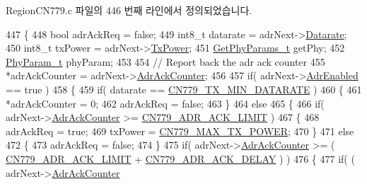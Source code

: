 Region\+C\+N779.\+c 파일의 446 번째 라인에서 정의되었습니다.


\begin{DoxyCode}
447 \{
448     \textcolor{keywordtype}{bool} adrAckReq = \textcolor{keyword}{false};
449     int8\_t datarate = adrNext->\mbox{\hyperlink{structs_adr_next_params_ae2f6080f3aa0e9485c55513ca56bb24d}{Datarate}};
450     int8\_t txPower = adrNext->\mbox{\hyperlink{structs_adr_next_params_a037b4f849fa8ed4aa1d3c58aef2b28ec}{TxPower}};
451     \mbox{\hyperlink{structs_get_phy_params}{GetPhyParams\_t}} getPhy;
452     \mbox{\hyperlink{unionu_phy_param}{PhyParam\_t}} phyParam;
453 
454     \textcolor{comment}{// Report back the adr ack counter}
455     *adrAckCounter = adrNext->\mbox{\hyperlink{structs_adr_next_params_a24f0356a3491bf07be9ac99ffa33896a}{AdrAckCounter}};
456 
457     \textcolor{keywordflow}{if}( adrNext->\mbox{\hyperlink{structs_adr_next_params_ab3e2fb44577c95786e11aacd56769703}{AdrEnabled}} == \textcolor{keyword}{true} )
458     \{
459         \textcolor{keywordflow}{if}( datarate == \mbox{\hyperlink{group___r_e_g_i_o_n_c_n779_ga78e9e4ce4dd6df844573865d9de7e268}{CN779\_TX\_MIN\_DATARATE}} )
460         \{
461             *adrAckCounter = 0;
462             adrAckReq = \textcolor{keyword}{false};
463         \}
464         \textcolor{keywordflow}{else}
465         \{
466             \textcolor{keywordflow}{if}( adrNext->\mbox{\hyperlink{structs_adr_next_params_a24f0356a3491bf07be9ac99ffa33896a}{AdrAckCounter}} >= \mbox{\hyperlink{group___r_e_g_i_o_n_c_n779_ga8c19c4c4ef1a00d6865607b7d61f0325}{CN779\_ADR\_ACK\_LIMIT}} )
467             \{
468                 adrAckReq = \textcolor{keyword}{true};
469                 txPower = \mbox{\hyperlink{group___r_e_g_i_o_n_c_n779_ga8a70356561f3416db21a1e93b4ee4ae9}{CN779\_MAX\_TX\_POWER}};
470             \}
471             \textcolor{keywordflow}{else}
472             \{
473                 adrAckReq = \textcolor{keyword}{false};
474             \}
475             \textcolor{keywordflow}{if}( adrNext->\mbox{\hyperlink{structs_adr_next_params_a24f0356a3491bf07be9ac99ffa33896a}{AdrAckCounter}} >= ( \mbox{\hyperlink{group___r_e_g_i_o_n_c_n779_ga8c19c4c4ef1a00d6865607b7d61f0325}{CN779\_ADR\_ACK\_LIMIT}} + 
      \mbox{\hyperlink{group___r_e_g_i_o_n_c_n779_ga56814f06a0fa6b826baad368920004a4}{CN779\_ADR\_ACK\_DELAY}} ) )
476             \{
477                 \textcolor{keywordflow}{if}( ( adrNext->\mbox{\hyperlink{structs_adr_next_params_a24f0356a3491bf07be9ac99ffa33896a}{AdrAckCounter}} %

\end{DoxyCode}
